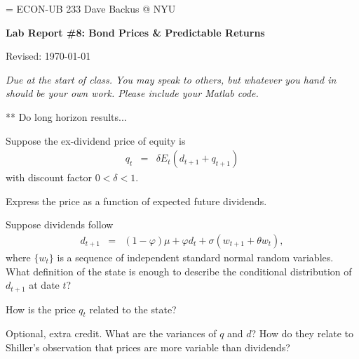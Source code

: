\documentclass[11pt]{exam}
\begin{document}
\parskip=\bigskipamount
\parindent=0.0in
\thispagestyle{empty}
{\large ECON-UB 233 \hfill Dave Backus @ NYU}

\bigskip\bigskip
\centerline{\Large \bf Lab Report \#8:  Bond Prices \& Predictable Returns}
\centerline{Revised: \today}

\bigskip
{\it Due at the start of class.
You may speak to others, but whatever you hand in should be your own work.
Please include your Matlab code.}


\begin{questions}
\question *** Do long horizon results...  

Suppose the ex-dividend price of equity is
\begin{eqnarray}
    q_t &=& \delta E_t \left( d_{t+1} + q_{t+1} \right)
    \label{eq:forward}
\end{eqnarray}
with discount factor $ 0 < \delta < 1 $.
\begin{parts}
\item Express the price as a function of expected future dividends.
\item Suppose dividends follow
\begin{eqnarray*}
    d_{t+1} &=& (1-\varphi) \mu + \varphi d_t + \sigma( w_{t+1} + \theta w_t ) ,
\end{eqnarray*}
where $\{ w_t \} $ is a sequence of independent standard normal random variables.
What definition of the state is enough to describe the conditional distribution of $d_{t+1}$ at date $t$?
\item How is the price $q_t$ related to the state?
\item Optional, extra credit.  What are the variances of $q$ and $d$?
How do they relate to Shiller's observation that prices are more variable
than dividends?
\end{parts}


\end{questions}
\end{document}
